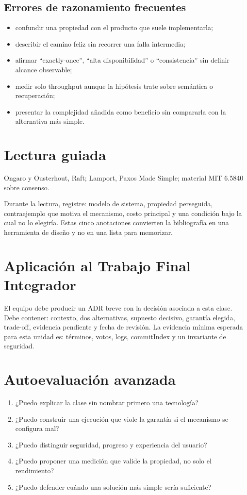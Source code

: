 \documentclass[variant=apuntes,cover=institutional,mode=screen]{ua-engineering-v6-article}
\begin{document}
\subsection{Errores de razonamiento frecuentes}
\begin{itemize}
\item confundir una propiedad con el producto que suele implementarla;
\item describir el camino feliz sin recorrer una falla intermedia;
\item afirmar ``exactly-once'', ``alta disponibilidad'' o ``consistencia'' sin definir alcance observable;
\item medir solo throughput aunque la hipótesis trate sobre semántica o recuperación;
\item presentar la complejidad añadida como beneficio sin compararla con la alternativa más simple.
\end{itemize}

\section{Lectura guiada}
Ongaro y Ousterhout, Raft; Lamport, Paxos Made Simple; material MIT 6.5840 sobre consenso.

Durante la lectura, registre: modelo de sistema, propiedad perseguida, contraejemplo que motiva el mecanismo, costo principal y una condición bajo la cual no lo elegiría. Estas cinco anotaciones convierten la bibliografía en una herramienta de diseño y no en una lista para memorizar.

\section{Aplicación al Trabajo Final Integrador}
El equipo debe producir un ADR breve con la decisión asociada a esta clase. Debe contener: contexto, dos alternativas, supuesto decisivo, garantía elegida, trade-off, evidencia pendiente y fecha de revisión. La evidencia mínima esperada para esta unidad es: términos, votos, logs, commitIndex y un invariante de seguridad.

\section{Autoevaluación avanzada}
\begin{enumerate}
\item ¿Puedo explicar la clase sin nombrar primero una tecnología?
\item ¿Puedo construir una ejecución que viole la garantía si el mecanismo se configura mal?
\item ¿Puedo distinguir seguridad, progreso y experiencia del usuario?
\item ¿Puedo proponer una medición que valide la propiedad, no solo el rendimiento?
\item ¿Puedo defender cuándo una solución más simple sería suficiente?
\end{enumerate}
\end{document}
